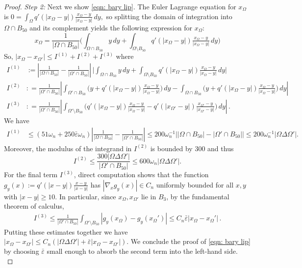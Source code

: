 \documentclass[10pt,a4paper]{amsart}
\numberwithin{equation}{section}
\def\e{\varepsilon}
\def\W{\Omega}
\def\baryEps{\bar{\e}}
\def\TBF{q}
\begin{document}
\begin{proof}
{\it Step 2: } Next we show \eqref{eqn: bary lip}. The Euler Lagrange equation for $x_\W$ is 
$0 = \int_\W \TBF'(|x_\W-y|) \frac{x_\W - y}{|x_\W-y|} \,dy,$ so splitting the domain of integration into $\W \cap B_{50}$ and its complement yields the following expression for $x_\W$:
\[
x_\W = \frac{1}{|\W \cap B_{50}|}\Big( \int_{\W\cap B_{50}} y\,dy + \int_{\W \setminus B_{50}} \TBF'(|x_\W -y|) \tfrac{ x_\W -y}{|x_\W -y|} \,dy \Big)
\]
So, $
|x_\W -x_{\W'}| \leq I^{(1)} + I^{(2)} + I^{(3)}$
where 
\begin{align*}
	I^{(1)} &:=  \left| \frac{1}{|\W \cap B_{50}|} -  \frac{1}{|\W' \cap B_{50}|}\right| \, 
	 \bigg| \int_{\W\cap B_{50}} y\,dy + \int_{\W \setminus B_{50}} \TBF'(|x_\W -y|) \tfrac{ x_\W -y}{|x_\W -y|} \,dy \bigg|\\
	 I^{(2)} & : = \frac{1}{|\W' \cap B_{50}|}
	 \left|  \int_{\W' \cap B_{50}} \Big( y + \TBF'(|x_\W - y|) \tfrac{x_\W - y}{|x_{\W }-y|} \Big) \,dy -   \int_{\W \cap B_{50}} \Big( y + \TBF'(|x_\W - y|) \tfrac{x_\W - y}{|x_{\W }-y|} \Big) \,dy\right|\\
	 I^{(3)} &: =\frac{1}{|\W' \cap B_{50} |} \left| \int_{\W' \setminus B_{50}} \Big(\TBF'(|x_\W - y|) \tfrac{x_\W - y}{|x_{\W }-y|}  -\TBF'(|x_{\W'} - y|) \tfrac{x_{\W'} - y}{|x_{\W' }-y|} \Big)\,dy  \right|  \,.
\end{align*}
We have 
\begin{align*}
	I^{(1)} 
	 &\leq  \left( 51  \omega_n +250 \baryEps \omega_n\right) \left| \frac{1}{|\W \cap B_{50}|} -  \frac{1}{|\W' \cap B_{50}|}\right| 
	  \leq 200\omega_n^{-1} \big| |\W \cap B_{50}| - |\W' \cap B_{50}|\big| \leq 200\omega_n^{-1}|\W \Delta \W'|.
\end{align*}
Moreover, the modulus of the integrand in $I^{(2)}$ is bounded by $300$ and thus  
\[
I^{(2)}  \leq \frac{300 |\W\Delta \W'| }{|\W' \cap B_{50}|} \leq 600 \omega_n  |\W\Delta \W'|.
\]
 For the final term $I^{(3)}$, direct computation shows that  the function ${g}_y(x):= \TBF'(|x-y|) \frac{x-y}{|x-y|}$ has $|\nabla_x {g}_y(x)|\in C_n$ uniformly bounded for all $x,y$ with $|x-y| \geq 10$. In particular, since $x_\W, x_{\W'}$ lie in $B_3$, by the fundamental theorem of calculus,
\begin{align*}
		I^{(3)} \leq \frac{1}{|\W' \cap B_{50}|} 
		 \int_{\W' \setminus B_{50}} 
		 |{g}_y(x_\W) - {g}_y(x_\W')| \leq C_n \baryEps  |x_\W - x_\W'| \,. 
\end{align*}
Putting these estimates together we have $|x_\W -x_{\W'}| \leq C_n ( |\W\Delta \W'| + \baryEps |x_\W -x_{\W'}|)$. We conclude the proof of \eqref{eqn: bary lip} by choosing $\baryEps$ small enough to absorb the second term into the left-hand side.\\



\end{proof}
\end{document}
